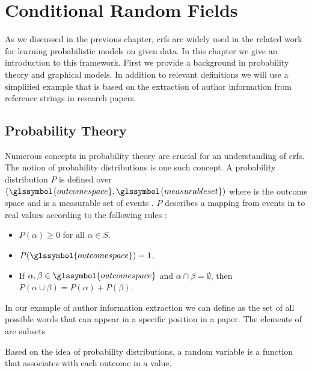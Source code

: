 \chapter{Conditional Random Fields}\label{cha:crfs}

As we discussed in the previous chapter, \glspl{crf} are widely used in the related work for learning probabilistic models on given data.
In this chapter we give an introduction to this framework.
First we provide a background in probability theory and graphical models.
In addition to relevant definitions we will use a simplified example that is based on the extraction of author information from reference strings in research papers.\\


\section{Probability Theory}\label{sec:probability-theory}
Numerous concepts in probability theory are crucial for an understanding of \glspl{crf}.
The notion of \glspl{probability distribution} is one such concept.
A \gls{probability distribution} $P$ is defined over $(\glssymbol{outcome space},\glssymbol{measurable set})$ where  is the \gls{outcome space} and  is a \gls{measurable set} of \glspl{event} \citep{koller2009probabilistic}.
$P$ describes a mapping from events in  to real values according to the following rules \citep{koller2009probabilistic}:
\begin{itemize}
  \item $P(\alpha)\geq 0 $ for all $ \alpha \in S$.
  \item $P(\glssymbol{outcome space})=1$.
  \item If $\alpha,\beta\in \glssymbol{outcome space}$ and $\alpha\cap\beta = \emptyset$, then $P(\alpha\cup\beta)=P(\alpha)+P(\beta)$.
\end{itemize}

In our example of author information extraction we can define  as the set of all possible words that can appear in a specific position in a paper.
The elements of  are subsets


Based on the idea of \glspl{probability distribution}, a \gls{random variable} is a \gls{function} that associates with each outcome in  a value.

